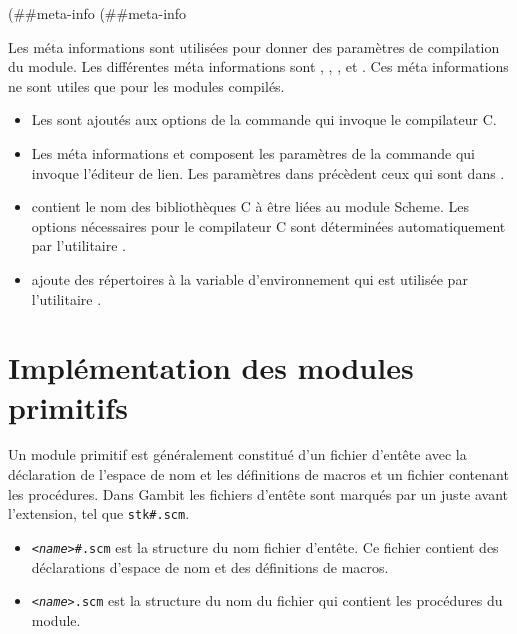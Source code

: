 \begin{center}
  \begin{mplisting}{0.5}
(##meta-info %
(##meta-info %
\end{mplisting}
\end{center}

Les méta informations sont utilisées pour donner des paramètres de compilation
du module. Les différentes méta informations sont ,
, , 
et . Ces méta informations ne sont utiles que pour les modules
compilés.

\begin{itemize}
  \item Les  sont ajoutés aux options de la commande qui
    invoque le compilateur C.

  \item Les méta informations  et 
    composent les paramètres de la commande qui invoque l'éditeur de lien.
    Les paramètres dans  précèdent ceux
    qui sont dans .

  \item {} contient le nom des bibliothèques C à être
    liées au module Scheme. Les options nécessaires pour le compilateur
    C sont déterminées automatiquement par l'utilitaire .

  \item {} ajoute des répertoires à la variable d'environnement
     qui est utilisée par l'utilitaire .

\end{itemize}

\section{Implémentation des modules primitifs}

Un module primitif est généralement constitué d'un fichier d'entête avec la
déclaration de l'espace de nom et les définitions de macros et un fichier
contenant les procédures. Dans Gambit les fichiers d'entête sont marqués par un
\lstcode{#} juste avant l'extension, tel que \texttt{stk\#.scm}.

\begin{itemize}
  \item \texttt{\textit{<name>}\#.scm} est la structure du nom fichier d'entête.
    Ce fichier contient des déclarations d'espace de nom et des
    définitions de macros.

  \item \texttt{\textit{<name>}.scm} est la structure du nom du fichier qui contient
    les procédures du module.

\end{itemize}


